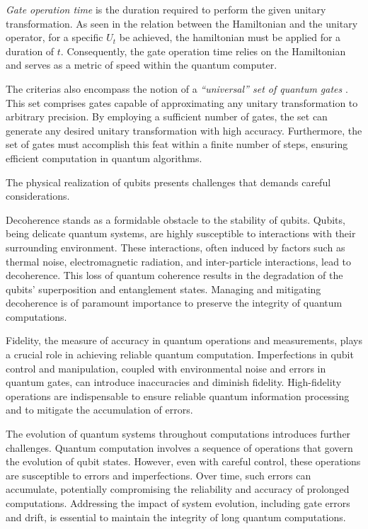 \documentclass[
  journal=largetwo,
  year=2023,
]{cup-journal}
\begin{document}
  { \it Gate operation time } is the duration required to perform the given unitary transformation. As seen in the relation between the Hamiltonian and the unitary operator, for a specific \(U_t\) be achieved, the hamiltonian must be applied for a duration of \(t\). Consequently, the gate operation time relies on the Hamiltonian and serves as a metric of speed within the quantum computer.

The criterias also encompass the notion of a { \it “universal” set of quantum gates }. This set comprises gates capable of approximating any unitary transformation to arbitrary precision. By employing a sufficient number of gates, the set can generate any desired unitary transformation with high accuracy. Furthermore, the set of gates must accomplish this feat within a finite number of steps, ensuring efficient computation in quantum algorithms.


The physical realization of qubits presents challenges that demands careful considerations.

Decoherence stands as a formidable obstacle to the stability of qubits. Qubits, being delicate quantum systems, are highly susceptible to interactions with their surrounding environment. These interactions, often induced by factors such as thermal noise, electromagnetic radiation, and inter-particle interactions, lead to decoherence. This loss of quantum coherence results in the degradation of the qubits' superposition and entanglement states. Managing and mitigating decoherence is of paramount importance to preserve the integrity of quantum computations.

Fidelity, the measure of accuracy in quantum operations and measurements, plays a crucial role in achieving reliable quantum computation. Imperfections in qubit control and manipulation, coupled with environmental noise and errors in quantum gates, can introduce inaccuracies and diminish fidelity. High-fidelity operations are indispensable to ensure reliable quantum information processing and to mitigate the accumulation of errors.

The evolution of quantum systems throughout computations introduces further challenges. Quantum computation involves a sequence of operations that govern the evolution of qubit states. However, even with careful control, these operations are susceptible to errors and imperfections. Over time, such errors can accumulate, potentially compromising the reliability and accuracy of prolonged computations. Addressing the impact of system evolution, including gate errors and drift, is essential to maintain the integrity of long quantum computations.
\end{document}
